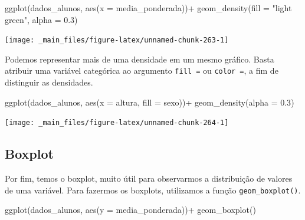 \documentclass[
  brazilian,
]{book}
\newenvironment{Shaded}{\begin{snugshade}}{\end{snugshade}}
\newcommand{\AttributeTok}[1]{\textcolor[rgb]{0.77,0.63,0.00}{#1}}
\newcommand{\FloatTok}[1]{\textcolor[rgb]{0.00,0.00,0.81}{#1}}
\newcommand{\FunctionTok}[1]{\textcolor[rgb]{0.00,0.00,0.00}{#1}}
\newcommand{\NormalTok}[1]{#1}
\newcommand{\SpecialCharTok}[1]{\textcolor[rgb]{0.00,0.00,0.00}{#1}}
\newcommand{\StringTok}[1]{\textcolor[rgb]{0.31,0.60,0.02}{#1}}
\begin{document}
\begin{Shaded}
\begin{Highlighting}[]
\FunctionTok{ggplot}\NormalTok{(dados\_alunos,}
       \FunctionTok{aes}\NormalTok{(}\AttributeTok{x =}\NormalTok{ media\_ponderada))}\SpecialCharTok{+}
  \FunctionTok{geom\_density}\NormalTok{(}\AttributeTok{fill =} \StringTok{"light green"}\NormalTok{,}
               \AttributeTok{alpha =} \FloatTok{0.3}\NormalTok{)}
\end{Highlighting}
\end{Shaded}

\begin{center}\texttt{[image: \_main\_files/figure-latex/unnamed-chunk-263-1]} \end{center}

Podemos representar mais de uma densidade em um mesmo gráfico. Basta atribuir uma variável categórica ao argumento \texttt{fill\ =} ou \texttt{color\ =}, a fim de distinguir as densidades.

\begin{Shaded}
\begin{Highlighting}[]
\FunctionTok{ggplot}\NormalTok{(dados\_alunos,}
       \FunctionTok{aes}\NormalTok{(}\AttributeTok{x =}\NormalTok{ altura,}
           \AttributeTok{fill =}\NormalTok{ sexo))}\SpecialCharTok{+}
  \FunctionTok{geom\_density}\NormalTok{(}\AttributeTok{alpha =} \FloatTok{0.3}\NormalTok{)}
\end{Highlighting}
\end{Shaded}

\begin{center}\texttt{[image: \_main\_files/figure-latex/unnamed-chunk-264-1]} \end{center}

\hypertarget{boxplot}{%
\subsection{Boxplot}\label{boxplot}}

Por fim, temos o boxplot, muito útil para observarmos a distribuição de valores de uma variável. Para fazermos os boxplots, utilizamos a função \texttt{geom\_boxplot()}.

\begin{Shaded}
\begin{Highlighting}[]
\FunctionTok{ggplot}\NormalTok{(dados\_alunos,}
       \FunctionTok{aes}\NormalTok{(}\AttributeTok{y =}\NormalTok{ media\_ponderada))}\SpecialCharTok{+}
  \FunctionTok{geom\_boxplot}\NormalTok{()}
\end{Highlighting}
\end{Shaded}
\end{document}
